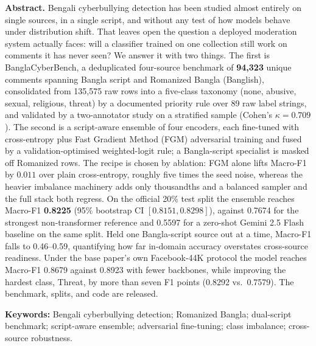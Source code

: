 \documentclass[11pt,a4paper]{article}
\def\emph#1{#1}%
\newcommand{\bench}{BanglaCyberBench}
\begin{document}
\begin{journalabstract}
\noindent\textbf{Abstract.\;}%
Bengali cyberbullying detection has been studied almost entirely on single sources, in a single script, and without any test of how models behave under distribution shift. That leaves open the question a deployed moderation system actually faces: will a classifier trained on one collection still work on comments it has never seen? We answer it with two things. The first is \bench{}, a deduplicated four-source benchmark of \textbf{94{,}323} unique comments spanning Bangla script and Romanized Bangla (\emph{Banglish}), consolidated from 135{,}575 raw rows into a five-class taxonomy (\emph{none, abusive, sexual, religious, threat}) by a documented priority rule over 89 raw label strings, and validated by a two-annotator study on a stratified sample (Cohen's $\kappa = 0.709$). The second is a script-aware ensemble of four encoders, each fine-tuned with cross-entropy plus Fast Gradient Method (FGM) adversarial training and fused by a validation-optimised weighted-logit rule; a Bangla-script specialist is masked off Romanized rows. The recipe is chosen by ablation: FGM alone lifts Macro-F1 by $0.011$ over plain cross-entropy, roughly five times the seed noise, whereas the heavier imbalance machinery adds only thousandths and a balanced sampler and the full stack both regress. On the official 20\% test split the ensemble reaches Macro-F1 \textbf{0.8225} (95\% bootstrap CI $[0.8151, 0.8298]$), against 0.7674 for the strongest non-transformer reference and 0.5597 for a zero-shot Gemini 2.5 Flash baseline on the same split. Held one Bangla-script source out at a time, Macro-F1 falls to 0.46--0.59, quantifying how far in-domain accuracy overstates cross-source readiness. Under the base paper's own Facebook-44K protocol the model reaches Macro-F1 0.8679 against 0.8923 with fewer backbones, while improving the hardest class, \emph{Threat}, by more than seven F1 points (0.8292 vs.\ 0.7579). The benchmark, splits, and code are released.


\vspace{4pt}
\noindent\textbf{Keywords:}\; Bengali cyberbullying detection;\; Romanized Bangla;\; dual-script benchmark;\; script-aware ensemble;\; adversarial fine-tuning;\; class imbalance;\; cross-source robustness.
\end{journalabstract}

\vspace{0.2em}
\end{document}
